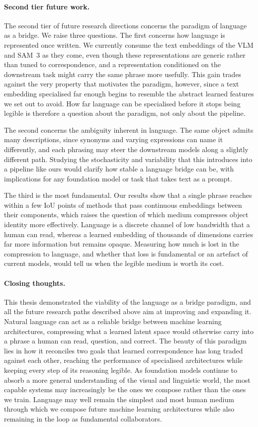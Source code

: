 \paragraph{Second tier future work.} The second tier of future research directions concerns the paradigm of language as a bridge. We raise three questions. The first concerns how language is represented once written. We currently consume the text embeddings of the VLM and SAM~3 as they come, even though these representations are generic rather than tuned to correspondence, and a representation conditioned on the downstream task might carry the same phrase more usefully. This gain trades against the very property that motivates the paradigm, however, since a text embedding specialised far enough begins to resemble the abstract learned features we set out to avoid. How far language can be specialised before it stops being legible is therefore a question about the paradigm, not only about the pipeline.

The second concerns the ambiguity inherent in language. The same object admits many descriptions, since synonyms and varying expressions can name it differently, and each phrasing may steer the downstream models along a slightly different path. Studying the stochasticity and variability that this introduces into a pipeline like ours would clarify how stable a language bridge can be, with implications for any foundation model or task that takes text as a prompt.

The third is the most fundamental. Our results show that a single phrase reaches within a few IoU points of methods that pass continuous embeddings between their components, which raises the question of which medium compresses object identity more effectively. Language is a discrete channel of low bandwidth that a human can read, whereas a learned embedding of thousands of dimensions carries far more information but remains opaque. Measuring how much is lost in the compression to language, and whether that loss is fundamental or an artefact of current models, would tell us when the legible medium is worth its cost.

\paragraph{Closing thoughts.} This thesis demonstrated the viability of the language as a bridge paradigm, and all the future research paths described above aim at improving and expanding it. Natural language can act as a reliable bridge between machine learning architectures, compressing what a learned latent space would otherwise carry into a phrase a human can read, question, and correct. The beauty of this paradigm lies in how it reconciles two goals that learned correspondence has long traded against each other, reaching the performance of specialised architectures while keeping every step of its reasoning legible. As foundation models continue to absorb a more general understanding of the visual and linguistic world, the most capable systems may increasingly be the ones we compose rather than the ones we train. Language may well remain the simplest and most human medium through which we compose future machine learning architectures while also remaining in the loop as fundamental collaborators.